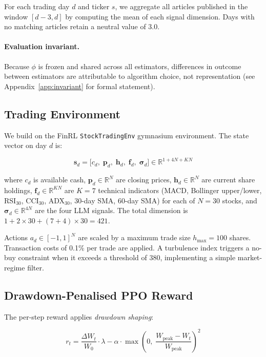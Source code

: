 \documentclass{article}
\begin{document}
For each trading day $d$ and ticker $s$, we aggregate all articles
published in the window $[d - 3, d]$ by computing the mean of each
signal dimension.
Days with no matching articles retain a neutral value of 3.0.

\paragraph{Evaluation invariant.}
Because $\phi$ is frozen and shared across all estimators, differences in outcome between estimators are attributable to algorithm choice, not representation (see Appendix~\ref{app:invariant} for formal statement).

\subsection{Trading Environment}
\label{sec:env}

We build on the FinRL \texttt{StockTradingEnv} gymnasium environment.
The state vector on day $d$ is:

\begin{equation}
\mathbf{s}_d = \bigl[
  c_d,\;
  \mathbf{p}_d,\;
  \mathbf{h}_d,\;
  \mathbf{f}_d,\;
  \boldsymbol{\sigma}_d
\bigr] \in \mathbb{R}^{1 + 4N + KN}
\end{equation}

where $c_d$ is available cash, $\mathbf{p}_d \in \mathbb{R}^N$ are
closing prices, $\mathbf{h}_d \in \mathbb{R}^N$ are current share
holdings, $\mathbf{f}_d \in \mathbb{R}^{KN}$ are $K=7$ technical
indicators (MACD, Bollinger upper/lower, RSI$_{30}$, CCI$_{30}$,
ADX$_{30}$, 30-day SMA, 60-day SMA) for each of $N=30$ stocks, and
$\boldsymbol{\sigma}_d \in \mathbb{R}^{4N}$ are the four LLM signals.
The total dimension is $1 + 2 \times 30 + (7+4) \times 30 = 421$.

Actions $a_d \in [-1, 1]^N$ are scaled by a maximum trade size
$h_\text{max} = 100$ shares.
Transaction costs of 0.1\% per trade are applied.
A turbulence index \citep{kritzman2010regime} triggers a
no-buy constraint when it exceeds a threshold of 380, implementing
a simple market-regime filter.

\subsection{Drawdown-Penalised PPO Reward}
\label{sec:dppo}

The per-step reward applies \emph{drawdown shaping}:

\begin{equation}
r_t = \frac{\Delta W_t}{W_0} \cdot \lambda - \alpha \cdot \max\!\left(0,\;
  \frac{W_\text{peak} - W_t}{W_\text{peak}}\right)^2
\end{equation}
\end{document}
